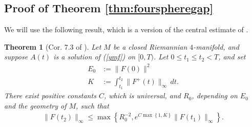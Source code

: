 \documentclass[12pt]{amsart}
\renewcommand{\1}{{\mathbf 1}}
\newtheorem{thm}{Theorem}[section]
\theoremstyle{others}
\numberwithin{equation}{section}
\begin{document}
\vspace{5mm}





\subsection{Proof of Theorem \ref{thm:fourspheregap}} %
We will use the following result, which is a version of the central estimate of \cite[Theorem 2.5]{instantons}.


\begin{thm}[Cor. 7.3 of \cite{oliveirawaldron}]\label{thm:F+boundimpliesFbound}
    Let \(M\) be a closed Riemannian \(4\)-manifold, and suppose \(A(t)\) is a solution of (\ref{ymf}) on \([0, T)\). Let \(0 \leq t_1 \leq t_2 < T\), and set
    \begin{align*}
       E_0 &:= \|F(0)\|^2 \\
       K &:= \int_{t_1}^{t_2} \|F^+(t)\|_\infty \, dt.
    \end{align*} There exist positive constants \(C\), which is universal, and  \(R_0\), depending on \(E_0\) and the geometry of \(M\), such that
    \begin{align}\label{F+boundimpliesFbound:bound}
        \|F(t_2)\|_\infty \leq \max\left\{R_0^{-2}, e^{C\max\left\{1, K \right\}}\|F(t_1)\|_\infty \right\}.
    \end{align}
\end{thm}
\end{document}
